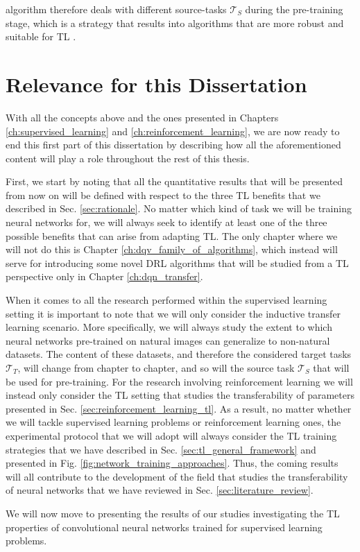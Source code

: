 algorithm therefore deals with different source-tasks $\mathcal{T}_S$ during the pre-training stage, which is a strategy that results into algorithms that are more robust and suitable for TL \cite{kirkpatrick2017overcoming}.  


\section{Relevance for this Dissertation}
\label{sec:relevance}

With all the concepts above and the ones presented in Chapters \ref{ch:supervised_learning} and \ref{ch:reinforcement_learning}, we are now ready to end this first part of this dissertation by describing how all the aforementioned content will play a role throughout the rest of this thesis. 

First, we start by noting that all the quantitative results that will be presented from now on will be defined with respect to the three TL benefits that we described in Sec. \ref{sec:rationale}. No matter which kind of task we will be training neural networks for, we will always seek to identify at least one of the three possible benefits that can arise from adapting TL. The only chapter where we will not do this is Chapter \ref{ch:dqv_family_of_algorithms}, which instead will serve for introducing some novel DRL algorithms that will be studied from a TL perspective only in Chapter \ref{ch:dqn_transfer}.

When it comes to all the research performed within the supervised learning setting it is important to note that we will only consider the inductive transfer learning scenario. More specifically, we will always study the extent to which neural networks pre-trained on natural images can generalize to non-natural datasets. The content of these datasets, and therefore the considered target tasks $\mathcal{T}_T$, will change from chapter to chapter, and so will the source task $\mathcal{T}_S$ that will be used for pre-training. For the research involving reinforcement learning we will instead only consider the TL setting that studies the transferability of parameters presented in Sec. \ref{sec:reinforcement_learning_tl}. As a result, no matter whether we will tackle supervised learning problems or reinforcement learning ones, the experimental protocol that we will adopt will always consider the TL training strategies that we have described in Sec. \ref{sec:tl_general_framework} and presented in Fig. \ref{fig:network_training_approaches}. Thus, the coming results will all contribute to the development of the field that studies the transferability of neural networks that we have reviewed in Sec. \ref{sec:literature_review}.

We will now move to presenting the results of our studies investigating the TL properties of convolutional neural networks trained for supervised learning problems.
